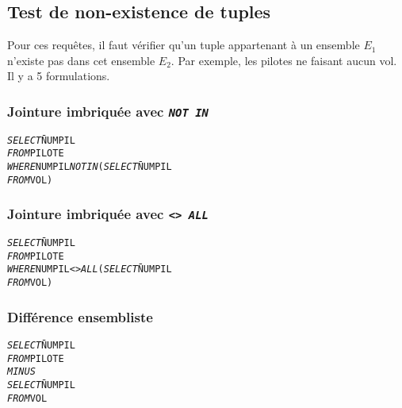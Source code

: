 \documentclass[10pt]{article}
\begin{document}
		\subsection{Test de non-existence de tuples}
			Pour ces requêtes, il faut vérifier qu'un tuple appartenant à un ensemble $E_1$ n'existe pas dans cet ensemble $E_2$. Par exemple, les pilotes ne faisant aucun vol. Il y a 5 formulations.
			
			\subsubsection{Jointure imbriquée avec \emph{\texttt{NOT IN}}}
				\begin{alltt}
					\begin{tabbing}
						\emph{SELECT} \= NUMPIL\\
						\emph{FROM} \> PILOTE\\
						\emph{WHERE} \> NUMPIL \emph{NOT IN} (\=\emph{SELECT} \= NUMPIL\=\\
															\>\>\emph{FROM} \> VOL\>)
					\end{tabbing}
				\end{alltt}
				
			\subsubsection{Jointure imbriquée avec \emph{\texttt{<> ALL}}}
				\begin{alltt}
					\begin{tabbing}
						\emph{SELECT} \= NUMPIL\\
						\emph{FROM} \> PILOTE\\
						\emph{WHERE} \> NUMPIL\emph{<>ALL} (\=\emph{SELECT} \= NUMPIL\=\\
															\>\>\emph{FROM} \> VOL\>)
					\end{tabbing}
				\end{alltt}
				
			\subsubsection{Différence ensembliste}
				\begin{alltt}
					\begin{tabbing}
						\emph{SELECT} \= NUMPIL\\
						\emph{FROM} \> PILOTE\\
						\emph{MINUS}\\
						\emph{SELECT} \= NUMPIL\\
						\emph{FROM} \> VOL\\
					\end{tabbing}
				\end{alltt}
				
\end{document}
